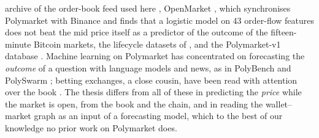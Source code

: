 archive of the order-book feed used here \cite{gozo2026polymarket}, OpenMarket
\cite{young2026openmarket}, which synchronises Polymarket with Binance and finds that a
logistic model on 43 order-flow features does not beat the mid price itself as a predictor of
the outcome of the fifteen-minute Bitcoin markets, the lifecycle datasets of
\textcite{jia2026unlocking}, and the Polymarket-v1 database \cite{qin2026polymarketv1}.
Machine learning on Polymarket has concentrated on forecasting the \emph{outcome} of a
question with language models and news, as in PolyBench \cite{cheng2026polybench} and
PolySwarm \cite{barot2026polyswarm}; betting exchanges, a close cousin, have been read with
attention over the book \cite{goncalves2025betting}.  The thesis differs from all of these in
predicting the \emph{price} while the market is open, from the book and the chain, and in
reading the wallet--market graph as an input of a forecasting model, which to the best of
our knowledge no prior work on Polymarket does.

